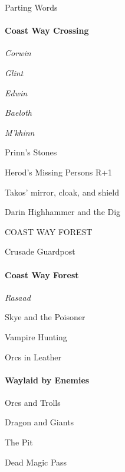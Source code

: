 \documentclass[10pt,a4,twoside]{book}
\begin{document}
\begin{multicols}{3}
\begin{trivlist}
\item Parting Words
\end{trivlist}

\paragraph*{Coast Way Crossing} %
\begin{trivlist}
\item \emph{Corwin}
\item \emph{Glint}
\item \emph{Edwin} %
\item \emph{Baeloth} %
\item \emph{M'khinn} %
\item Prinn's Stones
\item Herod's Missing Persons \textcolor{OliveGreen}{R+1}
\item Takos' mirror, cloak, and shield %
\item Darin Highhammer and the Dig %
\item COAST WAY FOREST \\

\item Crusade Guardpost
\end{trivlist}

\paragraph*{Coast Way Forest}
\begin{trivlist}
\item \textit{Rasaad}
\item Skye and the Poisoner
\item Vampire Hunting
\item Orcs in Leather
\end{trivlist}
\paragraph*{Waylaid by Enemies}
\begin{trivlist}
\item Orcs and Trolls
\item Dragon and Giants
\item The Pit
\item Dead Magic Pass
\end{trivlist}

\end{multicols}
\end{document}
